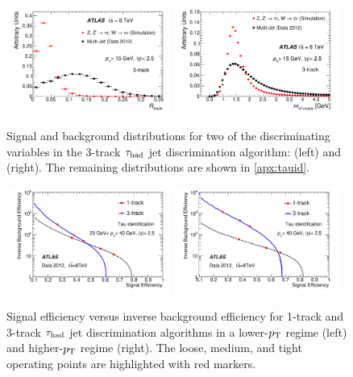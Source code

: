\begin{figure}[tp]
  \centering
  \includegraphics[width=0.48\textwidth]{figures/PERF-2013-06/fig_03a}
  \includegraphics[width=0.48\textwidth]{figures/PERF-2013-06/fig_03b}
  \caption{Signal and background distributions for two of the discriminating variables in the 3-track $\tau_\text{had}$ jet discrimination algorithm: \trkAvgDist{} (left) and \massTrkPizeroSys{} (right). The remaining distributions are shown in \cref{apx:tauid}.}
  \label{fig:taus-id3p}
\end{figure}

\begin{figure}[tp]
  \centering
  \includegraphics[width=0.48\textwidth]{figures/PERF-2013-06/fig_05a}
  \includegraphics[width=0.48\textwidth]{figures/PERF-2013-06/fig_05b}
  \caption{Signal efficiency versus inverse background efficiency for 1-track and 3-track $\tau_\text{had}$ jet discrimination algorithms in a lower-$p_{\mathrm{T}}$ regime (left) and higher-$p_{\mathrm{T}}$ regime (right). The loose, medium, and tight operating points are highlighted with red markers.}
  \label{fig:taus-idroc}
\end{figure}

